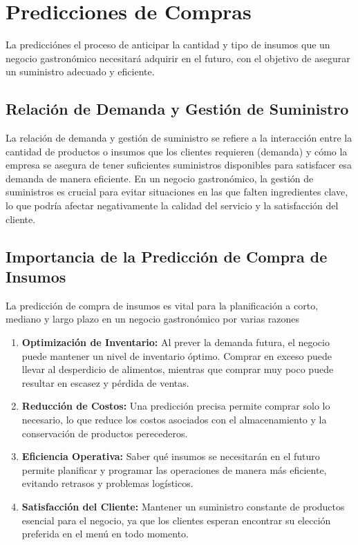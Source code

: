 \fancyhead{}
\fancyfoot{}
\newtheorem{teorema}{Teorema}
\cfoot{\thepage}


\chapter{Predicciones de Compras}
La predicciónes el proceso de anticipar la cantidad y tipo de insumos que un negocio gastronómico necesitará adquirir en el futuro, con el objetivo de asegurar un suministro adecuado y eficiente.


\section{Relación de Demanda y Gestión de Suministro}

La relación de demanda y gestión de suministro se refiere a la interacción entre la cantidad de productos o insumos que los clientes requieren (demanda) y cómo la empresa se asegura de tener suficientes suministros disponibles para satisfacer esa demanda de manera eficiente. En un negocio gastronómico, la gestión de suministros es crucial para evitar situaciones en las que falten ingredientes clave, lo que podría afectar negativamente la calidad del servicio y la satisfacción del cliente.

\section{Importancia de la Predicción de Compra de Insumos}

La predicción de compra de insumos es vital para la planificación a corto, mediano y largo plazo en un negocio gastronómico por varias razones

\begin{enumerate}
  \item \textbf{Optimización de Inventario:} Al prever la demanda futura, el negocio puede mantener un nivel de inventario óptimo. Comprar en exceso puede llevar al desperdicio de alimentos, mientras que comprar muy poco puede resultar en escasez y pérdida de ventas.
  
  \item \textbf{Reducción de Costos:} Una predicción precisa permite comprar solo lo necesario, lo que reduce los costos asociados con el almacenamiento y la conservación de productos perecederos.
  
  \item \textbf{Eficiencia Operativa:} Saber qué insumos se necesitarán en el futuro permite planificar y programar las operaciones de manera más eficiente, evitando retrasos y problemas logísticos.
  
  \item \textbf{Satisfacción del Cliente:} Mantener un suministro constante de productos esencial para el negocio, ya que los clientes esperan encontrar su elección preferida en el menú en todo momento.
\end{enumerate}

